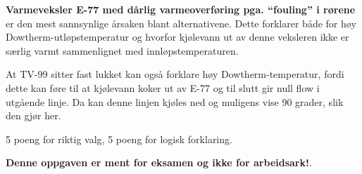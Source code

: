
{\bf Varmeveksler E-77 med dårlig varmeoverføring pga. ``fouling'' i rørene} er den mest sannsynlige årsaken blant alternativene. Dette forklarer både for høy Dowtherm-utløpstemperatur og hvorfor kjølevann ut av denne veksleren ikke er særlig varmt sammenlignet med innløpstemperaturen.

At TV-99 sitter fast lukket kan også forklare høy Dowtherm-temperatur, fordi dette kan føre til at kjølevann koker ut av E-77 og til slutt gir null flow i utgående linje. Da kan denne linjen kjøles ned og muligens vise 90 grader, slik den gjør her.

\vskip 10pt

5 poeng for riktig valg, 5 poeng for logisk forklaring.







{\bf Denne oppgaven er ment for eksamen og ikke for arbeidsark!}.


